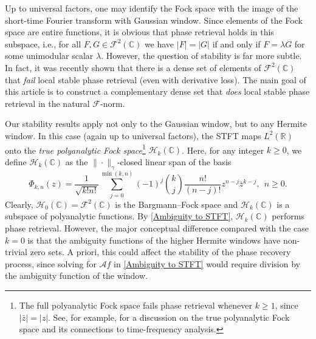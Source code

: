 \documentclass[11pt]{amsart}
\theoremstyle{remark}
\begin{document}
Up to universal factors, one may identify the Fock space with the image of the short-time Fourier transform with Gaussian window.
Since elements of the Fock space are entire functions, it is obvious that phase retrieval holds in this subspace, i.e., for all $F,G\in \mathcal{F}^2(\mathbb{C})$ we have $|F|=|G|$ if and only if $F=\lambda G$ for some unimodular scalar $\lambda$. However, the question of stability is far more subtle. In fact, it was recently shown that there is a dense set of elements of $\mathcal{F}^2(\mathbb{C})$ that \emph{fail} local stable phase retrieval (even with derivative loss). The main goal of this article is to construct a complementary dense set that \emph{does} local stable phase retrieval in the natural $\mathcal{F}$-norm.
 \vspace{0.5em}

Our stability results  apply not only to the Gaussian window, but to any Hermite window. In this case (again up to universal factors), the STFT maps $L^2(\mathbb{R})$ onto the \emph{true polyanalytic Fock space}\footnote{The full polyanalytic Fock space fails phase retrieval whenever $k\geq 1$, since $|\bar{z}|=|z|$. See, for example, \cite{MR3203099} for a discussion on the true polyanalytic Fock space and its connections to time-frequency analysis.} $\mathcal{H}_k(\mathbb{C})$. Here, for any integer $k\geq 0$, we define $\mathcal{H}_k(\mathbb{C})$ as the $\|\cdot\|_\gamma$-closed linear span of the  basis
\begin{equation*}
    \Phi_{k,n}(z)=\frac{1}{\sqrt{k!n!}}\sum_{j=0}^{\min(k,n)}(-1)^j\binom{k}{j}\frac{n!}{(n-j)!}z^{n-j}\overline{z}^{k-j}, \ \ n\geq 0.
\end{equation*}
Clearly, $\mathcal{H}_0(\mathbb{C})=\mathcal{F}^2(\mathbb{C})$ is the Bargmann--Fock space and $\mathcal{H}_k(\mathbb{C})$ is a subspace of polyanalytic functions. By \eqref{Ambiguity to STFT}, $\mathcal{H}_k(\mathbb{C})$  performs phase retrieval. However, the major conceptual difference compared with the case $k=0$ is that the ambiguity functions of the higher Hermite windows have non-trivial zero sets. A priori, this could affect the stability of the phase recovery process, since solving for $\mathcal{A}f$ in \eqref{Ambiguity to STFT} would require division by the ambiguity function of the window.
\end{document}
